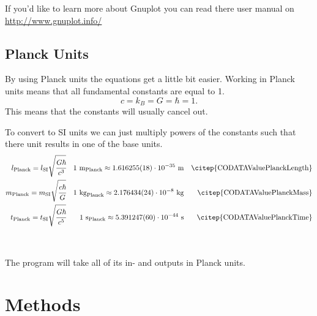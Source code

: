 \documentclass[11pt,DIV=10,final]{scrreprt} %
\begin{document}
If you'd like to learn more about Gnuplot you can read there user manual on \url{http://www.gnuplot.info/}

\section{Planck Units}
By using Planck units the equations get a little bit easier.
Working in Planck units means that all fundamental constants are equal to 1.
\[
  c = k_{B} = G = \hbar = 1.
\]
This means that the constants will usually cancel out.

To convert to SI units we can just multiply powers of the constants such that there unit results in one of the base units.
\begin{align*}
l_{\text{Planck}} = l_{\text{SI}} \sqrt{\cfrac{G \hbar}{c^{3}}}  && 1~\text{m}_{\text{Planck}}  \approx 1.616255(18) \cdot 10^{-35}~\text{m}  && \text{\citep{CODATAValuePlanckLength}} \\
m_{\text{Planck}} = m_{\text{SI}} \sqrt{\cfrac{c \hbar}{G}}      && 1~\text{kg}_{\text{Planck}} \approx  2.176434(24) \cdot 10^{-8}~\text{kg} && \text{\citep{CODATAValuePlanckMass}} \\
t_{\text{Planck}} = t_{\text{SI}} \sqrt{\cfrac{G \hbar}{c^{5}}} && 1~\text{s}_{\text{Planck}}  \approx 5.391247(60) \cdot 10^{-44}~\text{s}  && \text{\citep{CODATAValuePlanckTime}}
\end{align*}
\hspace*{\fill}~\citep[Table 1]{gaarder2016gravitational} \\
\\
The program will take all of its in- and outputs in Planck units.

\chapter{Methods}
\end{document}

